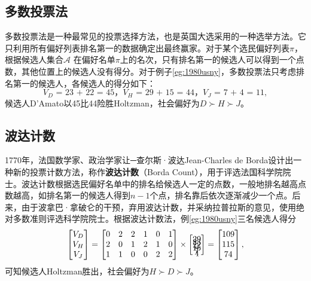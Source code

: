 \subsection{多数投票法}
多数投票法是一种最常见的投票选择方法，也是英国大选采用的一种选举方法。它只利用所有偏好列表排名第一的数据确定出最终赢家。对于某个选民偏好列表$\pi$，根据候选人集合$\mathcal A$ 在偏好名单$\pi$上的名次，只有排名第一的候选人可以得到一个点数，其他位置上的候选人没有得分。对于例子\ref{eg:1980usny}，多数投票法只考虑排名第一的候选人，各候选人的得分如下：
\[
    \text{$V_D$ = 23 + 22 = 45，$V_H$ = 29 + 15 = 44，$V_J$ = 7 + 4 = 11},
\]
候选人D'Amato以45比44险胜Holtzman，社会偏好为$D\succ H\succ J$。

\subsection{波达计数}
1770年，法国数学家、政治学家让─查尔斯·波达Jean-Charles de Borda\cite{borda1781m}设计出一种新的投票计数方法，称作\textbf{波达计数}（Borda Count），用于评选法国科学院院士。波达计数根据选民偏好名单中的排名给候选人一定的点数，一般地排名越高点数越高，如排名第一的候选人得到$n-1$个点，排名靠后依次逐渐减少一个点。后来，由于波拿巴·拿破仑的干预，弃用波达计数，并采纳拉普拉斯的意见，使用绝对多数准则评选科学院院士。根据波达计数法，例\ref{eg:1980usny}三名候选人得分
\[
    \begin{bmatrix}
        V_D\\
        V_H\\
        V_J\\
    \end{bmatrix} = 
    \begin{bmatrix}
      0 & 2 & 2 & 1 & 0 & 1\\
      2 & 0 & 1 & 2 & 1 & 0\\
      1 & 1 & 0 & 0 & 2 & 2\\
    \end{bmatrix}
    \times 
    \begin{bmatrix}
        \vspace{-0.3cm}
        \text{29}\\
        \vspace{-0.3cm}
        \text{23}\\
        \vspace{-0.3cm}
        \text{22}\\
        \vspace{-0.3cm}
        \text{15}\\
        \vspace{-0.3cm}
        \text{7}\\
        \vspace{-0.3cm}
        \text{4}\\
        \vspace{-0.3cm}
    \end{bmatrix} =
    \begin{bmatrix}
        \text{109}\\
        \text{115}\\
        \text{74}\\
    \end{bmatrix},
\]
可知候选人Holtzman胜出，社会偏好为$H\succ D\succ J$。

